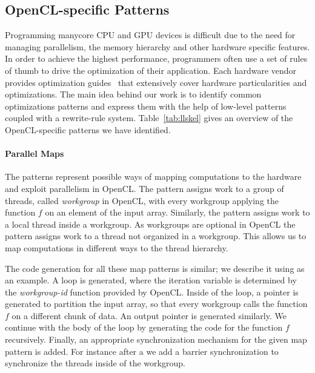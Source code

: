 \subsection{OpenCL-specific Patterns}

Programming manycore CPU and GPU devices is difficult due to the need for managing parallelism, the memory hierarchy and other hardware specific features.
In order to achieve the highest performance, programmers often use a set of rules of thumb to drive the optimization of their application.
Each hardware vendor provides optimization guides~\cite{nvidia11guide,amd12guide} that extensively cover hardware particularities and optimizations.
The main idea behind our work is to identify common optimizations patterns and express them with the help of low-level patterns coupled with
a rewrite-rule system.
%
Table~\ref{tab:llskel} gives an overview of the OpenCL-specific patterns we have identified.

\paragraph{Parallel Maps}

The  patterns represent possible ways of mapping computations to the hardware and exploit parallelism in OpenCL.
The  pattern assigns work to a group of threads, called \emph{workgroup} in OpenCL, with every workgroup applying the function $f$ on an element of the input array.
Similarly, the  pattern assigns work to a local thread inside a workgroup.
As workgroups are optional in OpenCL the  pattern assigns work to a thread not organized in a workgroup.
This allows us to map computations in different ways to the thread hierarchy.%

The code generation for all these map patterns is similar; we describe it using  as an example.
A loop is generated, where the iteration variable is determined by the \emph{workgroup-id} function provided by OpenCL.
Inside of the loop, a pointer is generated to partition the input array, so that every workgroup calls the function $f$ on a different chunk of data.
An output pointer is generated similarly.
We continue with the body of the loop by generating the code for the function $f$ recursively.
Finally, an appropriate synchronization mechanism for the given map pattern is added.
For instance after a  we add a barrier synchronization to synchronize the threads inside of the workgroup.

